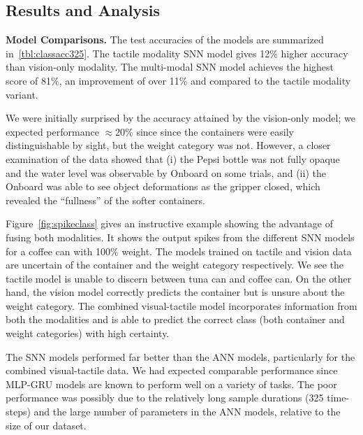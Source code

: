 \documentclass[fyp]{socreport}
\begin{document}
\subsection{Results and Analysis}

\noindent\textbf{Model Comparisons.}
The test accuracies of the models are summarized in~\autoref{tbl:classacc325}.
The tactile modality SNN model gives 12\% higher accuracy than vision-only
modality. The multi-modal SNN model achieves the highest score of 81\%, an
improvement of over 11\% and compared to the tactile modality variant.

We were initially surprised by the accuracy attained by the vision-only model;
we expected performance $\approx 20\%$ since since the containers were easily
distinguishable by sight, but the weight category was not. However, a closer
examination of the data showed that (i) the Pepsi bottle was not fully opaque
and the water level was observable by Onboard on some trials, and (ii) the
Onboard was able to see object deformations as the gripper closed, which
revealed the ``fullness'' of the softer containers.

Figure~\ref{fig:spikeclass} gives an instructive example showing the advantage
of fusing both modalities. It shows the output spikes from the different SNN
models for a coffee can with 100\% weight. The models trained on tactile and
vision data are uncertain of the container and the weight category respectively.
We see the tactile model is unable to discern between tuna can and coffee can.
On the other hand, the vision model correctly predicts the container but is
unsure about the weight category. The combined visual-tactile model incorporates
information from both the modalities and is able to predict the correct class
(both container and weight categories) with high certainty.

The SNN models performed far better than the ANN models, particularly for the
combined visual-tactile data. We had expected comparable performance since
MLP-GRU models are known to perform well on a variety of tasks. The poor
performance was possibly due to the relatively long sample durations (325
time-steps) and the large number of parameters in the ANN models, relative to
the size of our dataset.
\end{document}
